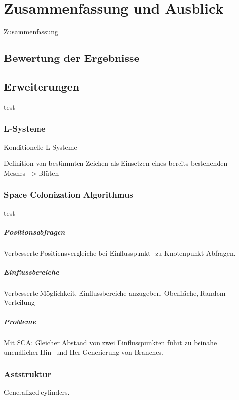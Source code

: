 \chapter{Zusammenfassung und Ausblick}

Zusammenfassung


\section{Bewertung der Ergebnisse}

\section{Erweiterungen}
test

\subsection{L-Systeme}

Konditionelle L-Systeme

Definition von bestimmten Zeichen als Einsetzen eines bereits bestehenden Meshes --> Blüten

\subsection{Space Colonization Algorithmus}
test
\paragraph{Positionsabfragen}
Verbesserte Positionsvergleiche bei Einflusspunkt- zu Knotenpunkt-Abfragen.

\paragraph{Einflussbereiche} 
Verbesserte Möglichkeit, Einflussbereiche anzugeben. Oberfläche, Random-Verteilung

\paragraph{Probleme}
Mit SCA: Gleicher Abstand von zwei Einflusspunkten führt zu beinahe unendlicher Hin- und Her-Generierung von Branches.

\subsection{Aststruktur}

Generalized cylinders.

